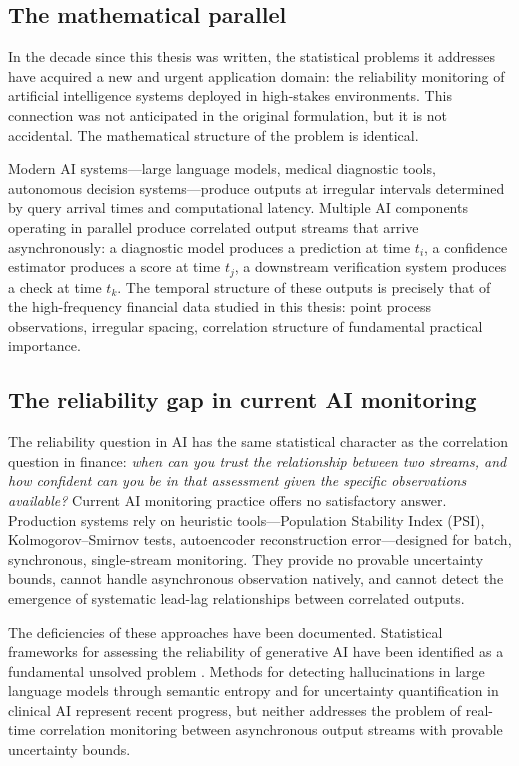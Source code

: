 \documentclass[reqno, 12pt]{amsart}
\theoremstyle{plain}
\theoremstyle{definition}
\theoremstyle{remark}
\begin{document}
\subsection{The mathematical parallel}

In the decade since this thesis was written, the statistical problems
it addresses have acquired a new and urgent application domain: the
reliability monitoring of artificial intelligence systems deployed in
high-stakes environments. This connection was not anticipated in the
original formulation, but it is not accidental. The mathematical
structure of the problem is identical.

Modern AI systems---large language models, medical diagnostic tools,
autonomous decision systems---produce outputs at irregular intervals
determined by query arrival times and computational latency. Multiple
AI components operating in parallel produce correlated output streams
that arrive asynchronously: a diagnostic model produces a prediction
at time $t_i$, a confidence estimator produces a score at time $t_j$,
a downstream verification system produces a check at time $t_k$. The
temporal structure of these outputs is precisely that of the
high-frequency financial data studied in this thesis: point process
observations, irregular spacing, correlation structure of fundamental
practical importance.

\subsection{The reliability gap in current AI monitoring}

The reliability question in AI has the same statistical character as
the correlation question in finance: \emph{when can you trust the
relationship between two streams, and how confident can you be in that
assessment given the specific observations available?} Current AI
monitoring practice offers no satisfactory answer. Production systems
rely on heuristic tools---Population Stability Index (PSI),
Kolmogorov--Smirnov tests, autoencoder reconstruction error---designed
for batch, synchronous, single-stream monitoring. They provide no
provable uncertainty bounds, cannot handle asynchronous observation
natively, and cannot detect the emergence of systematic lead-lag
relationships between correlated outputs.

The deficiencies of these approaches have been documented. Statistical
frameworks for assessing the reliability of generative AI have been
identified as a fundamental unsolved problem \citep{dobriban2025}.
Methods for detecting hallucinations in large language models through
semantic entropy \citep{farquhar2024} and for uncertainty
quantification in clinical AI \citep{lindenmeyer2025} represent recent
progress, but neither addresses the problem of real-time correlation
monitoring between asynchronous output streams with provable
uncertainty bounds.
\end{document}

